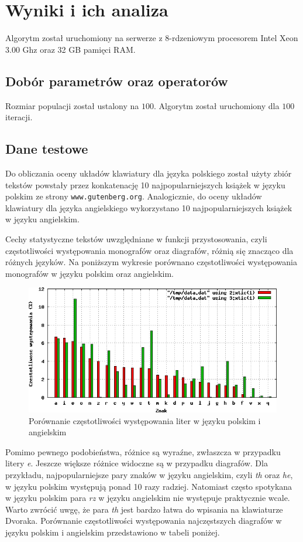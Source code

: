 \documentclass[brudnopis]{xmgr}
\begin{document}
\chapter{Wyniki i ich analiza}

Algorytm został uruchomiony na serwerze z 8-rdzeniowym procesorem Intel Xeon 3.00 Ghz oraz 32 GB pamięci RAM.

\section{Dobór parametrów oraz operatorów}

Rozmiar populacji został ustalony na $100$. Algorytm został uruchomiony dla $100$ iteracji.
\pagebreak[4]


\section{Dane testowe}

Do obliczania oceny układów klawiatury dla języka polskiego został użyty zbiór tekstów powstały przez konkatenację 10 najpopularniejszych książek w języku polskim ze strony {\tt www.gutenberg.org}. Analogicznie, do oceny układów klawiatury dla języka angielskiego wykorzystano 10 najpopularniejszych książek w języku angielskim.

Cechy statystyczne tekstów uwzględniane w funkcji przystosowania, czyli częstotliwości występowania monografów oraz diagrafów, różnią się znacząco dla różnych języków. Na poniższym wykresie porównano częstotliwości występowania monografów w języku polskim oraz angielskim.

\begin{figure}[!tbh]
\centering
\includegraphics[width=.8\hsize]{fig/frequencies}
\caption{Porównanie częstotliwości występowania liter w języku polskim i angielskim}
\end{figure}

Pomimo pewnego podobieństwa, różnice są wyraźne, zwłaszcza w przypadku litery \emph{e}. Jeszcze większe różnice widoczne są w przypadku diagrafów. Dla przykładu, najpopularniejsze pary znaków w języku angielskim, czyli \emph{th} oraz \emph{he}, w języku polskim występują ponad 10 razy radziej. Natomiast często spotykana w języku polskim para \emph{rz} w języku angielskim nie występuje praktycznie wcale. Warto zwrócić uwgę, że para \emph{th} jest bardzo łatwa do wpisania na klawiaturze Dvoraka. Porównanie częstotliwości występowania najczęstszych diagrafów w języku polskim i angielskim przedstawiono w tabeli poniżej.
\end{document}
